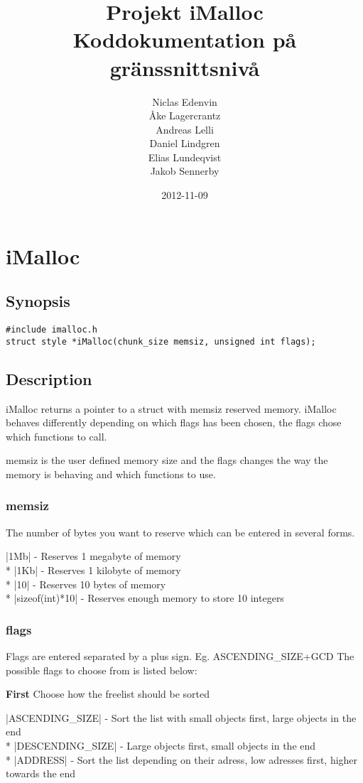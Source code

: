 \documentclass{article}
\title{
  Projekt iMalloc \\
  Koddokumentation på gränssnittsnivå
}
\author{
  Niclas Edenvin \\
  Åke Lagercrantz \\
  Andreas Lelli \\
  Daniel Lindgren \\
  Elias Lundeqvist \\
  Jakob Sennerby
}
\date{2012-11-09}
\begin{document}
\maketitle

\newpage

\section{iMalloc}

\subsection*{Synopsis}
\begin{verbatim}
#include imalloc.h
struct style *iMalloc(chunk_size memsiz, unsigned int flags);
\end{verbatim}

\subsection*{Description}

iMalloc returns a pointer to a struct with memsiz reserved memory. 
iMalloc behaves differently depending on which flags has been chosen, 
the flags chose which functions to call.

memsiz is the user defined memory size and the flags changes
the way the memory is behaving and which functions to use.

\subsubsection*{memsiz} The number of bytes you want to reserve which can be entered in several forms.

|1Mb| - Reserves 1 megabyte of memory \\*
|1Kb| - Reserves 1 kilobyte of memory \\*
|10| - Reserves 10 bytes of memory \\*
|sizeof(int)*10| - Reserves enough memory to store 10 integers
\subsubsection*{flags}
Flags are entered separated by a plus sign. Eg. ASCENDING\_SIZE+GCD
The possible flags to choose from is listed below:


{\bf First} Choose how the freelist should be sorted

|ASCENDING_SIZE| - Sort the list with small objects first, large objects in the end \\*
|DESCENDING_SIZE| - Large objects first, small objects in the end \\*
|ADDRESS| - Sort the list depending on their adress, low adresses first, higher towards the end
\end{document}
